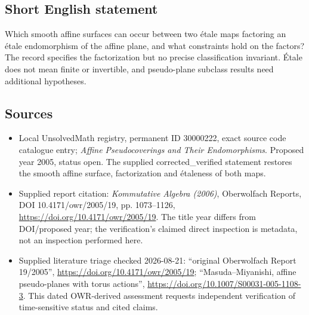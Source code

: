 \documentclass[11pt]{article}
\begin{document}
\subsection{Short English statement}
Which smooth affine surfaces can occur between two \'etale maps factoring an \'etale endomorphism of the affine plane, and what constraints hold on the factors? The record specifies the factorization but no precise classification invariant. \'Etale does not mean finite or invertible, and pseudo-plane subclass results need additional hypotheses.
\subsection{Sources}
\begin{itemize}
\item Local UnsolvedMath registry, permanent ID 30000222, exact source code catalogue entry; \emph{Affine Pseudocoverings and Their Endomorphisms}. Proposed year 2005, status open. The supplied corrected\_verified statement restores the smooth affine surface, factorization and \'etaleness of both maps.
\item Supplied report citation: \emph{Kommutative Algebra (2006)}, Oberwolfach Reports, DOI 10.4171/owr/2005/19, pp. 1073--1126, \url{https://doi.org/10.4171/owr/2005/19}. The title year differs from DOI/proposed year; the verification's claimed direct inspection is metadata, not an inspection performed here.
\item Supplied literature triage checked 2026-08-21: ``original Oberwolfach Report 19/2005'', \url{https://doi.org/10.4171/owr/2005/19}; ``Masuda--Miyanishi, affine pseudo-planes with torus actions'', \url{https://doi.org/10.1007/S00031-005-1108-3}. This dated OWR-derived assessment requests independent verification of time-sensitive status and cited claims.
\end{itemize}
\end{document}
